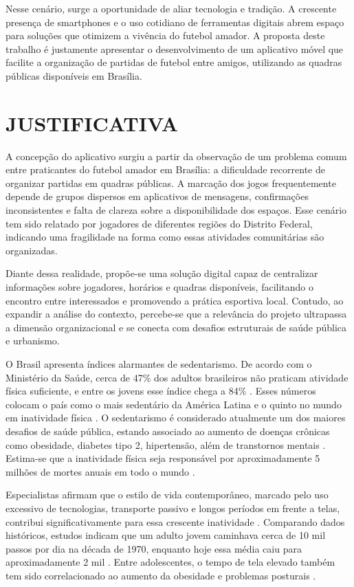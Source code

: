 Nesse cenário, surge a oportunidade de aliar tecnologia e tradição. A crescente presença de smartphones e o uso cotidiano de ferramentas digitais abrem espaço para soluções que otimizem a vivência do futebol amador. A proposta deste trabalho é justamente apresentar o desenvolvimento de um aplicativo móvel que facilite a organização de partidas de futebol entre amigos, utilizando as quadras públicas disponíveis em Brasília.

\section{JUSTIFICATIVA}

A concepção do aplicativo surgiu a partir da observação de um problema comum entre praticantes do futebol amador em Brasília: a dificuldade recorrente de organizar partidas em quadras públicas. A marcação dos jogos frequentemente depende de grupos dispersos em aplicativos de mensagens, confirmações inconsistentes e falta de clareza sobre a disponibilidade dos espaços. Esse cenário tem sido relatado por jogadores de diferentes regiões do Distrito Federal, indicando uma fragilidade na forma como essas atividades comunitárias são organizadas.

Diante dessa realidade, propõe-se uma solução digital capaz de centralizar informações sobre jogadores, horários e quadras disponíveis, facilitando o encontro entre interessados e promovendo a prática esportiva local. Contudo, ao expandir a análise do contexto, percebe-se que a relevância do projeto ultrapassa a dimensão organizacional e se conecta com desafios estruturais de saúde pública e urbanismo.

O Brasil apresenta índices alarmantes de sedentarismo. De acordo com o Ministério da Saúde, cerca de 47\% dos adultos brasileiros não praticam atividade física suficiente, e entre os jovens esse índice chega a 84\% \cite{ministerio2023,saraiva2024}. Esses números colocam o país como o mais sedentário da América Latina e o quinto no mundo em inatividade física \cite{oms2023,bvsms2023}. O sedentarismo é considerado atualmente um dos maiores desafios de saúde pública, estando associado ao aumento de doenças crônicas como obesidade, diabetes tipo 2, hipertensão, além de transtornos mentais \cite{bvsms2023,oms2023}. Estima-se que a inatividade física seja responsável por aproximadamente 5 milhões de mortes anuais em todo o mundo \cite{oms2023}.

Especialistas afirmam que o estilo de vida contemporâneo, marcado pelo uso excessivo de tecnologias, transporte passivo e longos períodos em frente a telas, contribui significativamente para essa crescente inatividade \cite{saraiva2024}. Comparando dados históricos, estudos indicam que um adulto jovem caminhava cerca de 10 mil passos por dia na década de 1970, enquanto hoje essa média caiu para aproximadamente 2 mil \cite{saraiva2024}. Entre adolescentes, o tempo de tela elevado também tem sido correlacionado ao aumento da obesidade e problemas posturais \cite{saraiva2024}.

